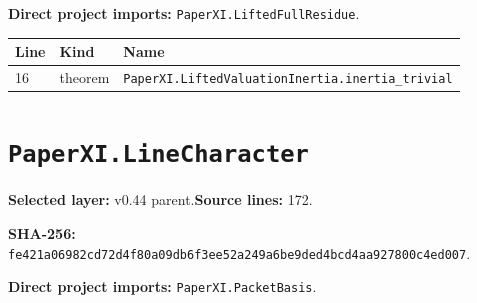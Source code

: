 \documentclass[10pt,oneside]{book}
\begin{document}
\textbf{Direct project imports:} \nolinkurl{PaperXI.LiftedFullResidue}.

\begin{longtable}{@{}p{}p{}p{}@{}}\toprule Line&Kind&Name\\\midrule\endhead

16&theorem&\nolinkurl{PaperXI.LiftedValuationInertia.inertia_trivial}\\

\bottomrule\end{longtable}

\section{\texorpdfstring{\nolinkurl{PaperXI.LineCharacter}}{PaperXI.LineCharacter}}\label{module:PaperXI.LineCharacter}

\textbf{Selected layer:} v0.44 parent.\quad\textbf{Source lines:} 172.\par\textbf{SHA-256:} {\scriptsize\nolinkurl{fe421a06982cd72d4f80a09db6f3ee52a249a6be9ded4bcd4aa927800c4ed007}}.


\textbf{Direct project imports:} \nolinkurl{PaperXI.PacketBasis}.
\end{document}

